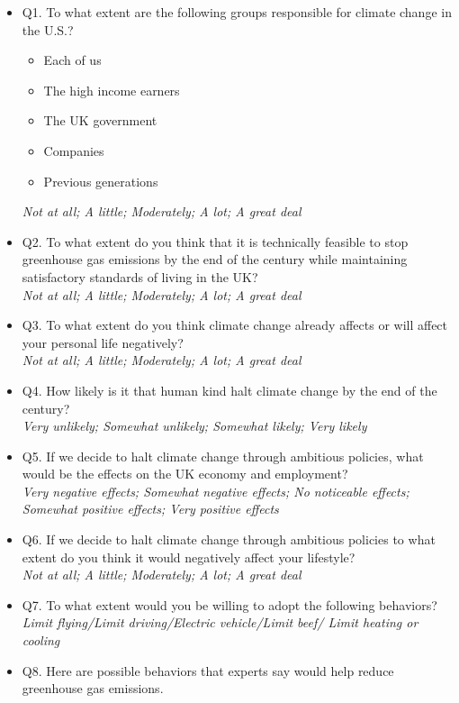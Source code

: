 \documentclass{article}
\begin{document}
\begin{itemize}
    \item Q1. To what extent are the following groups responsible for climate change in the U.S.?
        \begin{itemize}
            \item Each of us
            \item The high income earners
            \item The UK government
            \item Companies
            \item Previous generations
        \end{itemize}
    \textit{Not at all; A little; Moderately; A lot; A great deal}
    \item Q2. To what extent do you think that it is technically feasible to stop greenhouse gas emissions by the end of the century while maintaining satisfactory standards of living in the UK?\\
    \textit{Not at all; A little; Moderately; A lot; A great deal}
    \item Q3. To what extent do you think climate change already affects or will affect your personal life negatively? \\
    \textit{Not at all; A little; Moderately; A lot; A great deal}
    \item Q4. How likely is it that human kind halt climate change by the end of the century? \\
    \textit{Very unlikely; Somewhat unlikely; Somewhat likely; Very likely}
    \item Q5. If we decide to halt climate change through ambitious policies, what would be the effects on the UK economy and employment? \\
    \textit{Very negative effects; Somewhat negative effects; No noticeable effects; Somewhat positive effects; Very positive effects}
    \item Q6. If we decide to halt climate change through ambitious policies to what extent do you think it would negatively affect your lifestyle? \\
    \textit{Not at all; A little; Moderately; A lot; A great deal}
    \item Q7. To what extent would you be willing to adopt the following behaviors? \\
    \textit{Limit flying/Limit driving/Electric vehicle/Limit beef/ Limit heating or cooling}
    \item Q8. Here are possible behaviors that experts say would help reduce greenhouse gas emissions.

\end{itemize}
\end{document}
